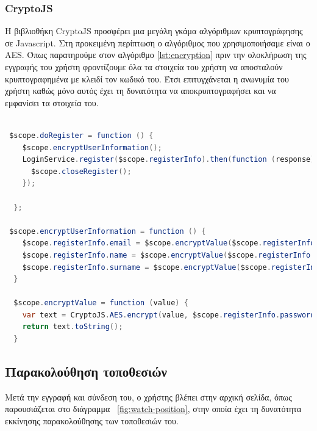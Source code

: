 \newpage

\subsubsection{CryptoJS}
Η βιβλιοθήκη CryptoJS προσφέρει μια μεγάλη γκάμα αλγόριθμων κρυπτογράφησης σε Javascript. Στη προκειμένη περίπτωση ο αλγόριθμος που χρησιμοποιήσαμε είναι ο AES. Όπως παρατηρούμε στον αλγόριθμο \ref{lst:encryption} πριν την ολοκλήρωση της εγγραφής του χρήστη φροντίζουμε όλα τα στοιχεία του χρήστη να αποσταλούν κρυπτογραφημένα με κλειδί τον κωδικό του. Έτσι επιτυγχάνεται η ανωνυμία του χρήστη καθώς μόνο αυτός έχει τη δυνατότητα να αποκρυπτογραφήσει και να εμφανίσει τα στοιχεία του.

\begin{lstlisting}[language=Java, caption=Κρυπτογράφηση Στοιχείων, label={lst:encryption}]

 $scope.doRegister = function () {
    $scope.encryptUserInformation();
    LoginService.register($scope.registerInfo).then(function (response) {
      $scope.closeRegister();
    });

  };

 $scope.encryptUserInformation = function () {
    $scope.registerInfo.email = $scope.encryptValue($scope.registerInfo.email);
    $scope.registerInfo.name = $scope.encryptValue($scope.registerInfo.name);
    $scope.registerInfo.surname = $scope.encryptValue($scope.registerInfo.surname);
  }

  $scope.encryptValue = function (value) {
    var text = CryptoJS.AES.encrypt(value, $scope.registerInfo.password);
    return text.toString();
  }
\end{lstlisting}

\subsection{Παρακολούθηση τοποθεσιών}
Μετά την εγγραφή και σύνδεση του, ο χρήστης βλέπει στην αρχική σελίδα, όπως παρουσιάζεται στο διάγραμμα ~\ref{fig:watch-position}, στην οποία έχει τη δυνατότητα εκκίνησης παρακολούθησης των τοποθεσιών του.


